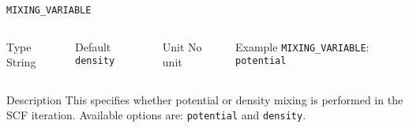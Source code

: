 \begin{frame}[allowframebreaks]{\texttt{MIXING\_VARIABLE}} \label{MIXING_VARIABLE}
\vspace*{-12pt}
\begin{columns}
\begin{block}{Type}
String
\end{block}

\begin{block}{Default}
\texttt{density}
\end{block}

\begin{block}{Unit}
No unit
\end{block}

\begin{block}{Example}
\texttt{MIXING\_VARIABLE}: \texttt{potential}
\end{block}
\end{columns}

\begin{block}{Description}
This specifies whether potential or density mixing is performed in the SCF iteration. Available options are: \texttt{potential} and \texttt{density}.
\end{block}

\end{frame}



